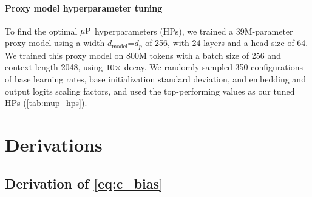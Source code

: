 %

\paragraph{Proxy model hyperparameter tuning}\label{sec:proxy_tuning}



To find the optimal $\mbox{$\mu$P}$ hyperparameters (HPs), we trained a
39M-parameter proxy model using a width $d_{\text{model}}$=$d_p$ of
256, with 24 layers and a head size of 64.  We trained this proxy
model on 800M tokens with a batch size of 256 and context length 2048,
using $\mbox{10}\times$ decay.  We randomly sampled 350 configurations of base
learning rates, base initialization standard deviation, and embedding
and output logits scaling factors, and used the top-performing values
as our tuned HPs (\cref{tab:mup_hps}).

\section{Derivations}\label{sec:derivations}

\subsection{Derivation of \cref{eq:c_bias}}\label{sec:c_bias_derivation}

